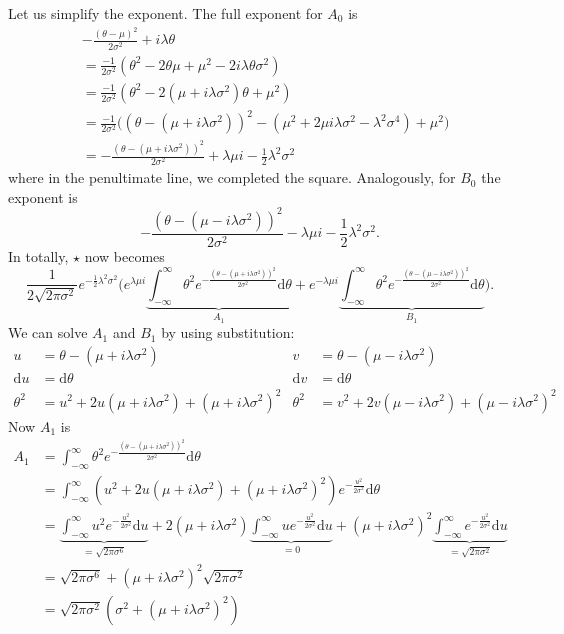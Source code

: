 \documentclass[]{report}
\begin{document}
Let us simplify the exponent. The full exponent for $A_0$ is
\begin{align}
    &-\frac{(\theta-\mu)^2}{2\sigma^2} + i\lambda\theta\\
    &=\frac{-1}{2\sigma^2}(\theta^2 - 2\theta\mu + \mu^2 - 2i\lambda\theta\sigma^2)\\
    &=\frac{-1}{2\sigma^2}(\theta^2 - 2(\mu + i\lambda\sigma^2)\theta + \mu^2)\\
    &=\frac{-1}{2\sigma^2}\big( (\theta - (\mu + i \lambda \sigma^2))^2 - (\mu^2 + 2\mu i \lambda \sigma^2 - \lambda^2 \sigma^4)+\mu^2\big)\\
    &=-\frac{(\theta - (\mu + i \lambda \sigma^2))^2}{2\sigma^2} + \lambda \mu i - \frac{1}{2}\lambda^2\sigma^2
\end{align}
where in the penultimate line, we completed the square. Analogously, for $B_0$ the exponent is
\begin{equation}
    -\frac{(\theta - (\mu - i \lambda \sigma^2))^2}{2\sigma^2} - \lambda \mu i - \frac{1}{2}\lambda^2\sigma^2.
\end{equation}
In totally, $\star$ now becomes
\begin{equation}
    \frac{1}{2\sqrt{2\pi \sigma^2}} e^{-\frac{1}{2}\lambda^2\sigma^2}
    \Big(
        e^{\lambda \mu i}\underbrace{\int_{-\infty}^{\infty}\theta^2e^{-\frac{(\theta - (\mu + i \lambda \sigma^2))^2}{2\sigma^2}} \text{d}\theta}_{A_1} +
        e^{-\lambda \mu i}\underbrace{\int_{-\infty}^{\infty}\theta^2e^{-\frac{(\theta - (\mu - i \lambda \sigma^2))^2}{2\sigma^2}}\text{d}\theta}_{B_1}
    \Big).
\end{equation}
We can solve $A_1$ and $B_1$ by using substitution:
\begin{align}
    u &= \theta - (\mu + i \lambda \sigma^2) & v &= \theta - (\mu - i \lambda \sigma^2)\\
    \text{d}u &= \text{d}\theta & \text{d}v &= \text{d}\theta\\
    \theta^2 &= u^2 + 2u(\mu + i \lambda \sigma^2) + (\mu + i \lambda \sigma^2)^2 &
    \theta^2 &= v^2 + 2v(\mu - i \lambda \sigma^2) + (\mu - i \lambda \sigma^2)^2
\end{align}
Now $A_1$ is
\begin{align}
    A_1 &= \int_{-\infty}^{\infty}\theta^2e^{-\frac{(\theta - (\mu + i \lambda \sigma^2))^2}{2\sigma^2}} \text{d}\theta\\
    &= \int_{-\infty}^{\infty}(u^2 + 2u(\mu + i \lambda \sigma^2) + (\mu + i \lambda \sigma^2)^2)e^{-\frac{u^2}{2\sigma^2}} \text{d}\theta\\
    &=
    \underbrace{\int_{-\infty}^{\infty}u^2 e^{-\frac{u^2}{2\sigma^2}} \text{d}u}_{=\sqrt{2\pi\sigma^6}} +
    2(\mu + i \lambda \sigma^2) \underbrace{\int_{-\infty}^{\infty} ue^{-\frac{u^2}{2\sigma^2}} \text{d}u}_{=0} +
    (\mu + i \lambda \sigma^2)^2 \underbrace{\int_{-\infty}^{\infty}e^{-\frac{u^2}{2\sigma^2}} \text{d}u}_{=\sqrt{2\pi\sigma^2}}\\
    &= \sqrt{2\pi\sigma^6} + (\mu + i \lambda \sigma^2)^2 \sqrt{2\pi\sigma^2}\\
    &= \sqrt{2\pi\sigma^2} (\sigma^2 + (\mu + i \lambda \sigma^2)^2)
\end{align}
\end{document}
